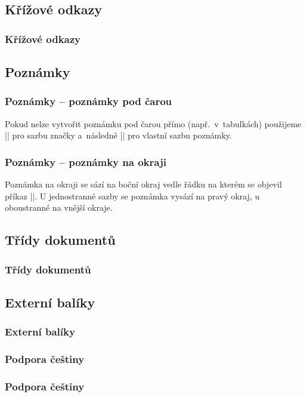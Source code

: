 \subsection{Křížové odkazy}
\begin{frame}
	\frametitle{Křížové odkazy}
\end{frame}


\subsection{Poznámky}
\begin{frame}[fragile]
	\frametitle{Poznámky -- poznámky pod čarou}
	\begin{remark}
		Pokud nelze vytvořit poznámku pod čarou přímo (např.\ v~tabulkách) použijeme |\footnotemark| pro sazbu značky a~následně || pro vlastní sazbu poznámky.
	\end{remark}
\end{frame}


\begin{frame}[fragile]
	\frametitle{Poznámky -- poznámky na okraji}
	Poznámka na okraji se sází na boční okraj vedle řádku na kterém se objevil příkaz |\marginpar|.
	U jednostranné sazby se poznámka vysází na pravý okraj, u oboustranné na vnější okraje.
\end{frame}


\subsection{Třídy dokumentů}
\begin{frame}
	\frametitle{Třídy dokumentů}
\end{frame}


\subsection{Externí balíky}
\begin{frame}
	\frametitle{Externí balíky}
\end{frame}


\subsubsection{Podpora češtiny}
\begin{frame}
	\frametitle{Podpora češtiny}
\end{frame}


